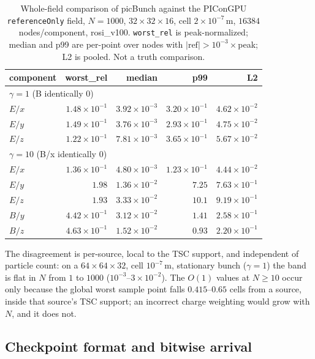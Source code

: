 \begin{table}[t]
\centering
\small
\caption{Whole-field comparison of picBunch against the PIConGPU
\texttt{referenceOnly} field, $N=1000$, $32\times32\times16$, cell
$2\times10^{-7}$\,m, $16384$ nodes/component, rosi\_v100.
\texttt{worst\_rel} is peak-normalized; median and p99 are per-point over
nodes with $|\mathrm{ref}|>10^{-3}\times$peak; L2 is pooled. Not a truth
comparison.}
\label{tab:wholefield}
\begin{tabular}{lrrrr}
\toprule
component & worst\_rel & median & p99 & L2 \\
\midrule
\multicolumn{5}{l}{\emph{$\gamma=1$} (B identically 0)} \\
$E/x$ & $1.48\times10^{-1}$ & $3.92\times10^{-3}$ & $3.20\times10^{-1}$ & $4.62\times10^{-2}$ \\
$E/y$ & $1.49\times10^{-1}$ & $3.76\times10^{-3}$ & $2.93\times10^{-1}$ & $4.75\times10^{-2}$ \\
$E/z$ & $1.22\times10^{-1}$ & $7.81\times10^{-3}$ & $3.65\times10^{-1}$ & $5.67\times10^{-2}$ \\
\midrule
\multicolumn{5}{l}{\emph{$\gamma=10$} (B/x identically 0)} \\
$E/x$ & $1.36\times10^{-1}$ & $4.80\times10^{-3}$ & $1.23\times10^{-1}$ & $4.44\times10^{-2}$ \\
$E/y$ & $1.98$  & $1.36\times10^{-2}$ & $7.25$ & $7.63\times10^{-1}$ \\
$E/z$ & $1.93$  & $3.33\times10^{-2}$ & $10.1$ & $9.19\times10^{-1}$ \\
$B/y$ & $4.42\times10^{-1}$ & $3.12\times10^{-2}$ & $1.41$ & $2.58\times10^{-1}$ \\
$B/z$ & $4.63\times10^{-1}$ & $1.52\times10^{-2}$ & $0.93$ & $2.20\times10^{-1}$ \\
\bottomrule
\end{tabular}
\end{table}

The disagreement is per-source, local to the TSC support, and independent
of particle count: on a $64\times64\times32$, cell $10^{-7}$\,m, stationary
bunch ($\gamma=1$) the band is flat in $N$ from $1$ to $1000$
($10^{-3}$--$3\times10^{-2}$). The $O(1)$ values at $N\ge10$ occur only
because the global worst sample point falls $0.415$--$0.65$ cells from a
source, inside that source's TSC support; an incorrect charge weighting would
grow with $N$, and it does not.

\subsection{Checkpoint format and bitwise arrival}

